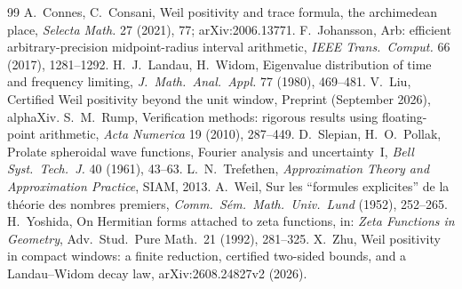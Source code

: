 \documentclass[11pt,a4paper]{article}
\theoremstyle{definition}
\begin{document}
\begin{thebibliography}{99}\small
{} A.~Connes, C.~Consani, Weil positivity and trace formula, the archimedean place, \emph{Selecta Math.} 27 (2021), 77; arXiv:2006.13771.
 F.~Johansson, Arb: efficient arbitrary-precision midpoint-radius interval arithmetic, \emph{IEEE Trans.\ Comput.} 66 (2017), 1281--1292.
 H.~J.~Landau, H.~Widom, Eigenvalue distribution of time and frequency limiting, \emph{J.\ Math.\ Anal.\ Appl.} 77 (1980), 469--481.
 V.~Liu, Certified Weil positivity beyond the unit window, Preprint (September 2026), alphaXiv.
 S.~M.~Rump, Verification methods: rigorous results using floating-point arithmetic, \emph{Acta Numerica} 19 (2010), 287--449.
 D.~Slepian, H.~O.~Pollak, Prolate spheroidal wave functions, Fourier analysis and uncertainty~I, \emph{Bell Syst.\ Tech.\ J.} 40 (1961), 43--63.
 L.~N.~Trefethen, \emph{Approximation Theory and Approximation Practice}, SIAM, 2013.
 A.~Weil, Sur les ``formules explicites'' de la th\'eorie des nombres premiers, \emph{Comm.\ S\'em.\ Math.\ Univ.\ Lund} (1952), 252--265.
 H.~Yoshida, On Hermitian forms attached to zeta functions, in: \emph{Zeta Functions in Geometry}, Adv.\ Stud.\ Pure Math.\ 21 (1992), 281--325.
 X.~Zhu, Weil positivity in compact windows: a finite reduction, certified two-sided bounds, and a Landau--Widom decay law, arXiv:2608.24827v2 (2026).
\end{thebibliography}
\end{document}
